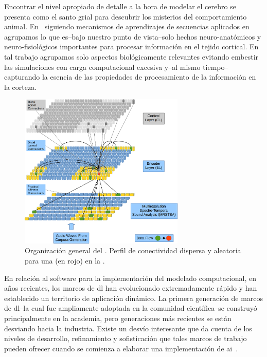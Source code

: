 {Encontrar el nivel apropiado de detalle a la hora de modelar el cerebro se presenta como el santo grial para descubrir los misterios del comportamiento animal.
En~\cite{10.1371/journal.pone.0217966} siguiendo mecanismos de aprendizajes de secuencias aplicados en~\cite{10.3389/fncir.2016.00023} agrupamos lo que es--bajo nuestro punto de vista--solo hechos neuro-anatómicos y neuro-fisiológicos importantes para procesar información en el tejido cortical.
En tal trabajo agrupamos solo aspectos biológicamente relevantes evitando embestir las simulaciones con carga computacional excesiva y--al mismo tiempo--capturando la esencia de las propiedades de procesamiento de la información en la corteza.

\begin{figure}[ht]
    \centering
    \includegraphics[width=0.7\textwidth]{EncoderColumnConnections1.png}
    \caption{Organización general del . Perfil de conectividad dispersa y aleatoria para una  (en rojo) en la .}
    \label{fig:EncoderColumnConnections1}
\end{figure}

En relación al software para la implementación del modelado computacional, en años recientes, los marcos de \gls{dl} han evolucionado extremadamente rápido y han establecido un territorio de aplicación dinámico.
La primera generación de marcos de \gls{dl}--la cual fue ampliamente adoptada en la comunidad científica--se construyó principalmente en la academia, pero generaciones más recientes se están desviando hacia la industria.
Existe un desvío interesante que da cuenta de los niveles de desarrollo, refinamiento y sofisticación que tales marcos de trabajo pueden ofrecer cuando se comienza a elaborar una implementación de \gls{ai}~\cite{Bahrampour2015ComparativeSO,7979887}.

}
